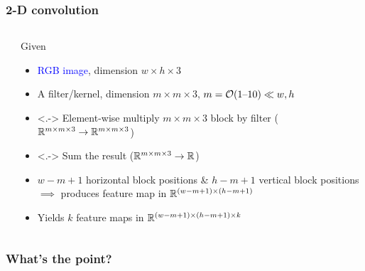 \begin{frame}
    \frametitle{2-D convolution}
    \begin{columns}
        \begin{column}{0.37\textwidth}
            
        \end{column}
        \begin{column}{0.63\textwidth}
            Given
            \begin{itemize}[<+->]
                \item \textcolor{blue}{RGB image}, dimension $w \times h \times 3$
                \item A \alert{filter}/\alert{kernel}, dimension $m \times m \times 3$, $m = \mathcal{O}(1 \text{--} 10) \ll w, h$
            \end{itemize}
            \begin{itemize}
                \item<.-> Element-wise multiply $m \times m \times 3$ block by filter ($\mathbb{R}^{m \times m \times 3} \to \mathbb{R}^{m \times m \times 3}$)
                \item<.-> Sum the result ($\mathbb{R}^{m \times m \times 3} \to \mathbb{R}$)
                \item<9-> $w - m + 1$ horizontal block positions \& $h - m + 1$ vertical block positions $\implies$ produces \textcolor{Green4}{feature map} in $\mathbb{R}^{(w-m+1) \times (h-m+1)}$
            \end{itemize}
            \begin{itemize}
                \item<10-> Yields $k$ feature maps in $\mathbb{R}^{(w-m+1) \times (h-m+1) \times k}$
            \end{itemize}
        \end{column}
    \end{columns}
\end{frame}

\begin{frame}
    \frametitle{What's the point?}
\end{frame}

